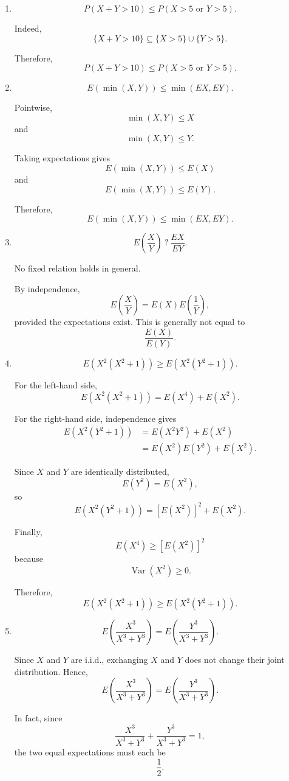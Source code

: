 \documentclass[11pt]{article}
\newenvironment{solution}{
    \par
    \begin{tcolorbox}[
        colback=white,
        colframe=uwgold,
        boxrule=0.7pt,
        arc=2mm,
        left=3mm,
        right=3mm,
        top=2mm,
        bottom=2mm,
        breakable,
        before skip=0.5em,
        after skip=1em,
        title=\textbf{Solution},
        coltitle=uwpurple,
        fonttitle=\bfseries
    ]
}{
    \end{tcolorbox}
}
\begin{document}
\begin{solution}
\begin{enumerate}[label=(\alph*)]
Since \(X\) and \(Y\) are positive,
\[
E(XY)\geq0,
\]
and hence
\[
E(XY)
\leq
\sqrt{E(X^2)E(Y^2)}.
\]


\item
\[
P(X+Y>10)
\leq
P(X>5\text{ or }Y>5).
\]

Indeed,
\[
\{X+Y>10\}
\subseteq
\{X>5\}\cup\{Y>5\}.
\]

Therefore,
\[
P(X+Y>10)
\leq
P(X>5\text{ or }Y>5).
\]


\item
\[
E(\min(X,Y))
\leq
\min(E X,E Y).
\]

Pointwise,
\[
\min(X,Y)\leq X
\]
and
\[
\min(X,Y)\leq Y.
\]

Taking expectations gives
\[
E(\min(X,Y))\leq E(X)
\]
and
\[
E(\min(X,Y))\leq E(Y).
\]

Therefore,
\[
E(\min(X,Y))
\leq
\min(E X,E Y).
\]


\item
\[
E\left(\frac{X}{Y}\right)
\ ?\
\frac{E X}{E Y}.
\]

No fixed relation holds in general.

By independence,
\[
E\left(\frac{X}{Y}\right)
=
E(X)E\left(\frac1Y\right),
\]
provided the expectations exist. This is generally not equal to
\[
\frac{E(X)}{E(Y)}.
\]


\item
\[
E\left(X^2(X^2+1)\right)
\geq
E\left(X^2(Y^2+1)\right).
\]

For the left-hand side,
\[
E\left(X^2(X^2+1)\right)
=
E(X^4)+E(X^2).
\]

For the right-hand side, independence gives
\[
\begin{aligned}
E\left(X^2(Y^2+1)\right)
&=
E(X^2Y^2)+E(X^2)\\
&=
E(X^2)E(Y^2)+E(X^2).
\end{aligned}
\]

Since \(X\) and \(Y\) are identically distributed,
\[
E(Y^2)=E(X^2),
\]
so
\[
E\left(X^2(Y^2+1)\right)
=
[E(X^2)]^2+E(X^2).
\]

Finally,
\[
E(X^4)\geq [E(X^2)]^2
\]
because
\[
\operatorname{Var}(X^2)\geq0.
\]

Therefore,
\[
E\left(X^2(X^2+1)\right)
\geq
E\left(X^2(Y^2+1)\right).
\]


\item
\[
E\left(\frac{X^3}{X^3+Y^3}\right)
=
E\left(\frac{Y^3}{X^3+Y^3}\right).
\]

Since \(X\) and \(Y\) are i.i.d., exchanging \(X\) and \(Y\) does not change
their joint distribution. Hence,
\[
E\left(\frac{X^3}{X^3+Y^3}\right)
=
E\left(\frac{Y^3}{X^3+Y^3}\right).
\]

In fact, since
\[
\frac{X^3}{X^3+Y^3}
+
\frac{Y^3}{X^3+Y^3}
=
1,
\]
the two equal expectations must each be
\[
\frac12.
\]

\end{enumerate}

\end{solution}
\end{document}
